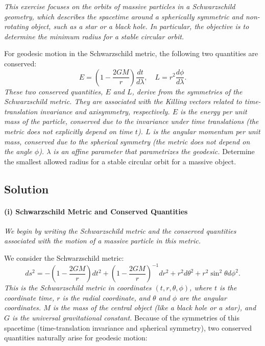 \textit{This exercise focuses on the orbits of massive particles in a Schwarzschild geometry, which describes the spacetime around a spherically symmetric and non-rotating object, such as a star or a black hole. In particular, the objective is to determine the minimum radius for a stable circular orbit.}

For geodesic motion in the Schwarzschild metric, the following two quantities are conserved:
\[
E = \left(1 - \frac{2GM}{r}\right) \frac{dt}{d\lambda},
\quad
L = r^{2} \frac{d\phi}{d\lambda}.
\]
\textit{These two conserved quantities, \(E\) and \(L\), derive from the symmetries of the Schwarzschild metric. They are associated with the Killing vectors related to time-translation invariance and axisymmetry, respectively. \(E\) is the energy per unit mass of the particle, conserved due to the invariance under time translations (the metric does not explicitly depend on time \(t\)). \(L\) is the angular momentum per unit mass, conserved due to the spherical symmetry (the metric does not depend on the angle \(\phi\)). \(\lambda\) is an affine parameter that parametrizes the geodesic.}
Determine the smallest allowed radius for a stable circular orbit for a massive object.

\subsection*{Solution}

\paragraph{(i) Schwarzschild Metric and Conserved Quantities}
\textit{We begin by writing the Schwarzschild metric and the conserved quantities associated with the motion of a massive particle in this metric.}

We consider the Schwarzschild metric:
\begin{equation}
ds^2 = - \left(1 - \frac{2GM}{r}\right)dt^2 + \left(1 - \frac{2GM}{r}\right)^{-1}dr^2 + r^2 d\theta^2 + r^2 \sin^2\theta d\phi^2.
\end{equation}
\textit{This is the Schwarzschild metric in coordinates \((t, r, \theta, \phi)\), where \(t\) is the coordinate time, \(r\) is the radial coordinate, and \(\theta\) and \(\phi\) are the angular coordinates. \(M\) is the mass of the central object (like a black hole or a star), and \(G\) is the universal gravitational constant.}
Because of the symmetries of this spacetime (time-translation invariance and spherical symmetry), two conserved quantities naturally arise for geodesic motion:

